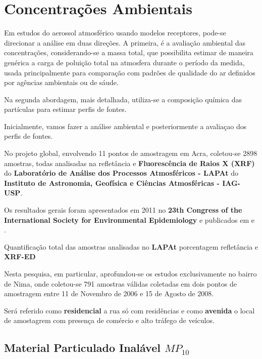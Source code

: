 \section{Concentrações Ambientais}

Em estudos do aerossol atmosférico usando modelos receptores, 
pode-se direcionar a análise em duas direções. 
A primeira, é a avaliação ambiental das concentrações, considerando-se a massa total,
que possibilita estimar de maneira genérica a carga de poluição total na atmosfera 
durante o período da medida, usada principalmente para comparação com padrões
de qualidade do ar definidos por agências ambientais ou de sáude. 

Na segunda abordagem, mais detalhada, utiliza-se a composição química 
das partículas para estimar perfis de fontes. 

Inicialmente, vamos fazer a análise ambiental e posteriormente a 
avaliaçao dos perfis de fontes.  

No projeto global, envolvendo 11 pontos de amostragem em Acra, 
coletou-se 2898 amostras, todas analisadas na refletância e 
\textbf{Fluorescência de Raios X (XRF)} do 
\textbf{Laboratório de Análise dos Processos Atmosféricos - LAPAt} 
do \textbf{Instituto de Astronomia, Geofísica e Ciências Atmosféricas - IAG-USP}.

Os resultados gerais foram apresentados em 2011 no
\textbf{23th Congress of the International Society for Environmental 
Epidemiology} \citep{zhou2011} e publicados em \cite{zhou2013} e \cite{zhou2014}. 

\begin{table}[H]
  \centering
  
  \caption{Quantificação total das amostras analisadas no \textbf{LAPAt} porcentagem
          refletância e \textbf{XRF-ED}}
\end{table}

Nesta pesquisa, em particular, aprofundou-se os estudos exclusivamente no bairro
de Nima, onde coletou-se 791 amostras válidas coletadas em dois pontos de 
amostragem entre 11 de Novembro de 2006 e 15 de Agosto de 2008.

Será referido como \textbf{residencial} a rua só com residências e como \textbf{avenida} 
o local de amostagrem com presença de comércio e alto tráfego de veículos.

\subsection{Material Particulado Inalável $MP_{10}$}

